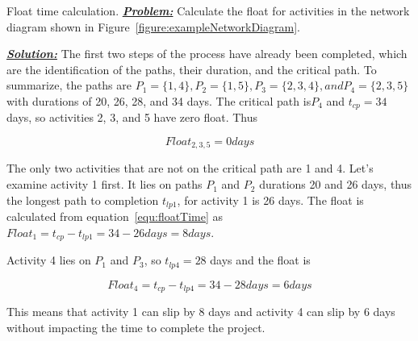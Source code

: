 \begin{example}{ Float time calculation.}
\label{example:projectManagementFloatTime}
\emph{\textbf{\ul{Problem:}}} Calculate the float for activities in the
network diagram shown in Figure~\ref{figure:exampleNetworkDiagram}.

\emph{\textbf{\ul{Solution:}}} The first two steps of the process have
already been completed, which are the identification of the paths, their
duration, and the critical path. To summarize, the paths are
$P_1 = \{1,4\}, P_2=\{1,5\}, P_3 =\{2,3,4\}, and P_4 =\{2,3,5\}$
with durations of 20, 26, 28, and 34 days. The critical path is$P_4$
and $t_{cp}=34$ days, so activities 2, 3, and 5 have zero float. Thus

$$Float_{2,3,5} = 0 days$$

The only two activities that are not on the critical path are 1 and 4.
Let's examine activity 1 first. It lies on paths $P_1$ and $P_2$
durations 20 and 26 days, thus the longest path to completion
$t_{lp1}$, for activity 1 is 26 days. The float is calculated from 
equation~\ref{equ:floatTime} as 
$Float_{1} =t_{cp} - t_{lp1} = 34-26 days = 8 days$.

Activity 4 lies on $P_1$ and $P_3$, so $t_{lp4} = 28$ days and the float is

$$Float_{4} = t_{cp} - t_{lp4} = 34 -28 days = 6 days$$

This means that activity 1 can slip by 8 days and activity 4 can slip by
6 days without impacting the time to complete the project.
\end{example}

